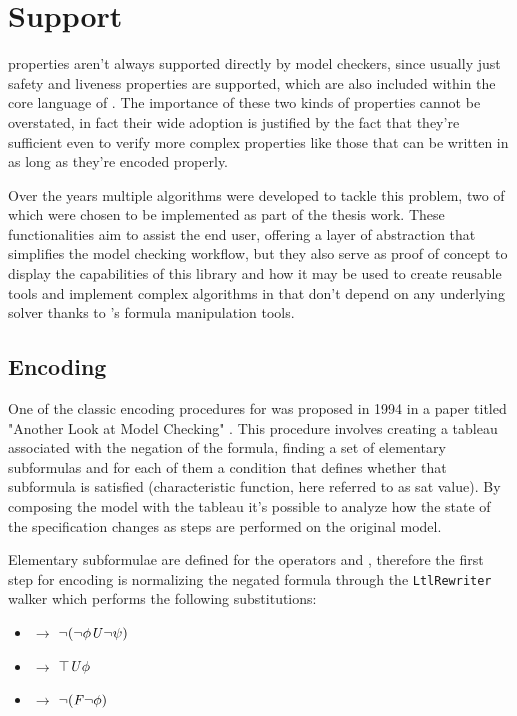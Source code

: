 \chapter{\ltl{} Support}
\label{ch:ltl-support}
\ltl{} properties aren't always supported directly by model checkers, since usually just safety and liveness properties are supported, which are also included within the core language of \vmtlib{}.
The importance of these two kinds of properties cannot be overstated, in fact their wide adoption is justified by the fact that they're sufficient even to verify more complex properties like those that can be written in \LTL{} as long as they're encoded properly.

Over the years multiple algorithms were developed to tackle this problem, two of which were chosen to be implemented as part of the thesis work.
These functionalities aim to assist the end user, offering a layer of abstraction that simplifies the model checking workflow, but they also serve as proof of concept to display the capabilities of this library and how it may be used to create reusable tools and implement complex algorithms in \python{} that don't depend on any underlying solver thanks to \pysmt{}'s formula manipulation tools.

\section{\ltltosmv{} Encoding}
One of the classic encoding procedures for \ltl{} was proposed in 1994 in a paper titled "Another Look at \ltl{} Model Checking" \cite{DBLP:conf/cav/ClarkeGH94}.
This procedure involves creating a tableau associated with the negation of the \ltl{} formula, finding a set of elementary subformulas and for each of them a condition that defines whether that subformula is satisfied (characteristic function, here referred to as sat value).
By composing the model with the tableau it's possible to analyze how the state of the \ltl{} specification changes as steps are performed on the original model.

Elementary subformulae are defined for the \ltl{} operators \fX{} and \fU{}, therefore the first step for encoding is normalizing the negated formula through the \texttt{LtlRewriter} walker which performs the following substitutions:
\begin{itemize}
    \item \fR{} $\longrightarrow{}$ $\lnot(\lnot \phi \mathit{U} \lnot \psi)$
    \item \fF{} $\longrightarrow{}$ $\top \mathit{U} \phi$
    \item \fG{} $\longrightarrow{}$ $\lnot (\mathit{F} \lnot \phi)$
\end{itemize}

